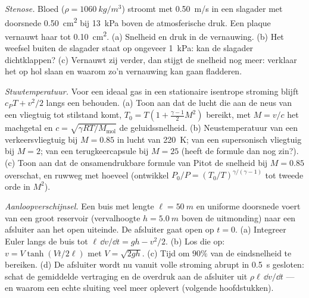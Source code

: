 \begin{exercise}[$\star\star$]\label{exo:b2:euler-bernoulli:9}
\emph{Stenose.} Bloed ($\rho = \qty{1060}{kg/m^3}$) stroomt met
\qty{0.50}{m/s} in een slagader met doorsnede \qty{0.50}{cm^2} bij
\qty{13}{kPa} boven de atmosferische druk. Een plaque vernauwt haar tot
\qty{0.10}{cm^2}. (a) Snelheid en druk in de vernauwing. (b) Het weefsel
buiten de slagader staat op ongeveer \qty{1}{kPa}: kan de slagader
dichtklappen? (c) Vernauwt zij verder, dan stijgt de snelheid nog meer:
verklaar het op hol slaan en waarom zo'n vernauwing kan gaan fladderen.
\end{exercise}

\begin{exercise}[$\star\star\star$]\label{exo:b2:euler-bernoulli:10}
\emph{Stuwtemperatuur.} Voor een ideaal gas in een stationaire isentrope
stroming blijft $c_PT + v^2/2$ langs een  behouden. (a) Toon aan
dat de lucht die aan de neus van een vliegtuig tot stilstand komt,
$T_0 = T(1 +
\tfrac{\gamma - 1}{2}M^2)$ bereikt, met $M = v/c$ het machgetal
en $c =
\sqrt{\gamma RT/M_{\text{mol}}}$ de geluidssnelheid. (b)
Neustemperatuur van een verkeersvliegtuig bij $M = 0.85$ in lucht van
\qty{220}{K}; van een supersonisch vliegtuig bij $M = 2$; van een
terugkeercapsule bij $M = 25$ (heeft de formule dan nog zin?). (c) Toon aan
dat de onsamendrukbare formule van Pitot de snelheid bij $M = 0.85$
overschat, en ruwweg met hoeveel (ontwikkel
$P_0/P = (T_0/T)^{\gamma/(\gamma - 1)}$ tot tweede orde in $M^2$).
\end{exercise}

\begin{exercise}[$\star\star\star$]\label{exo:b2:euler-bernoulli:11}
\emph{Aanloopverschijnsel.} Een buis met lengte $\ell = \qty{50}{m}$ en
uniforme doorsnede voert van een groot reservoir (vervalhoogte
$h = \qty{5.0}{m}$ boven de uitmonding) naar een afsluiter aan het open
uiteinde. De afsluiter gaat open op $t = 0$. (a) Integreer Euler langs de
buis tot $\ell\,\dd v/\dd t = gh - v^2/2$. (b) Los die op:
$v = V\tanh(Vt/2\ell)$ met $V = \sqrt{2gh}$. (c) Tijd om $90\%$ van de
eindsnelheid te bereiken. (d) De afsluiter wordt nu vanuit volle stroming
abrupt in \qty{0.5}{s} gesloten: schat de gemiddelde vertraging en de
overdruk aan de afsluiter uit $\rho\ell\,\dd v/\dd t$ --- en waarom een
echte sluiting veel meer oplevert (volgende hoofdstukken).
\end{exercise}

